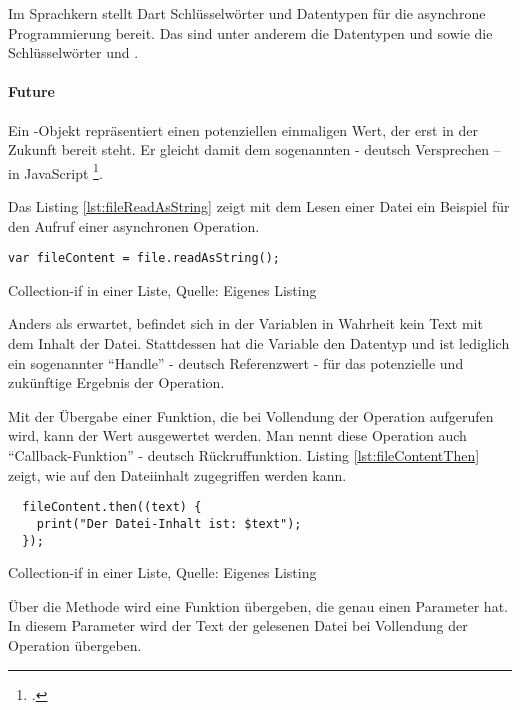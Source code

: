 Im Sprachkern stellt Dart Schlüsselwörter und Datentypen für die asynchrone Programmierung bereit.
Das sind unter anderem die Datentypen  und  sowie die Schlüsselwörter  und .

\paragraph{Future}
Ein -Objekt repräsentiert einen potenziellen einmaligen Wert, der erst in der Zukunft bereit steht.
Er gleicht damit dem sogenannten  - deutsch Versprechen – in JavaScript  \footcite[Vgl.][]{PromiseJavaScriptMDN}.

Das Listing \ref{lst:fileReadAsString} zeigt mit dem Lesen einer Datei ein Beispiel für den Aufruf einer asynchronen Operation.

\ifincludeall
  \begin{listing}[ht]
    \begin{verbatim}
var fileContent = file.readAsString();
\end{verbatim}
    \caption[Collection-if in einer Liste]{Collection-if in einer Liste, Quelle: Eigenes Listing}
    \label{lst:fileReadAsString}
  \end{listing}
\fi

Anders als erwartet, befindet sich in der Variablen  in Wahrheit kein Text mit dem Inhalt der Datei.
Stattdessen hat die Variable den Datentyp  und ist lediglich ein sogenannter \enquote{Handle} - deutsch Referenzwert - für das potenzielle und zukünftige Ergebnis der Operation.

Mit der Übergabe einer Funktion, die bei Vollendung der Operation aufgerufen wird, kann der Wert ausgewertet werden.
Man nennt diese Operation auch \enquote{Callback-Funktion} - deutsch Rückruffunktion.
Listing \ref{lst:fileContentThen}
zeigt, wie auf den Dateiinhalt zugegriffen werden kann.

\ifincludeall
  \begin{listing}[ht]
    \begin{verbatim}
  fileContent.then((text) {
    print("Der Datei-Inhalt ist: $text");
  });
\end{verbatim}
    \caption[Collection-if in einer Liste]{Collection-if in einer Liste, Quelle: Eigenes Listing}
    \label{lst:fileContentThen}
  \end{listing}
\fi

Über die Methode  wird eine Funktion übergeben, die genau einen Parameter hat.
In diesem Parameter wird der Text der gelesenen Datei bei Vollendung der Operation übergeben.

